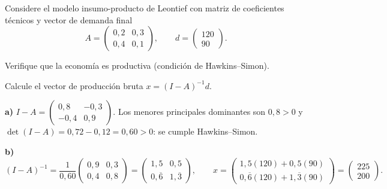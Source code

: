 \documentclass{academic-exam}
\begin{document}
\begin{pregunta}
Considere el modelo insumo-producto de Leontief con matriz de coeficientes
técnicos y vector de demanda final
\[
  A = \begin{pmatrix} 0{,}2 & 0{,}3\\ 0{,}4 & 0{,}1 \end{pmatrix},
  \qquad
  d = \begin{pmatrix} 120\\ 90 \end{pmatrix}.
\]
\begin{apartados}
  \item Verifique que la economía es productiva (condición de
        Hawkins--Simon). 
  \item Calcule el vector de producción bruta $x = (I-A)^{-1}d$. 
\end{apartados}
\espaciorespuesta{6.5cm}
\begin{solucion}
\textbf{a)} $I-A = \begin{pmatrix} 0{,}8 & -0{,}3\\ -0{,}4 & 0{,}9
\end{pmatrix}$. Los menores principales dominantes son $0{,}8>0$ y
$\det(I-A)=0{,}72-0{,}12=0{,}60>0$: se cumple Hawkins--Simon.

\textbf{b)}
\[
  (I-A)^{-1} = \frac{1}{0{,}60}
  \begin{pmatrix} 0{,}9 & 0{,}3\\ 0{,}4 & 0{,}8 \end{pmatrix}
  = \begin{pmatrix} 1{,}5 & 0{,}5\\ 0{,}\overline{6} & 1{,}\overline{3}
  \end{pmatrix},
  \qquad
  x = \begin{pmatrix} 1{,}5(120)+0{,}5(90)\\
        0{,}\overline{6}(120)+1{,}\overline{3}(90)\end{pmatrix}
    = \begin{pmatrix} 225\\ 200 \end{pmatrix}.
\]
\end{solucion}
\end{pregunta}

\findelexamen
\end{document}
